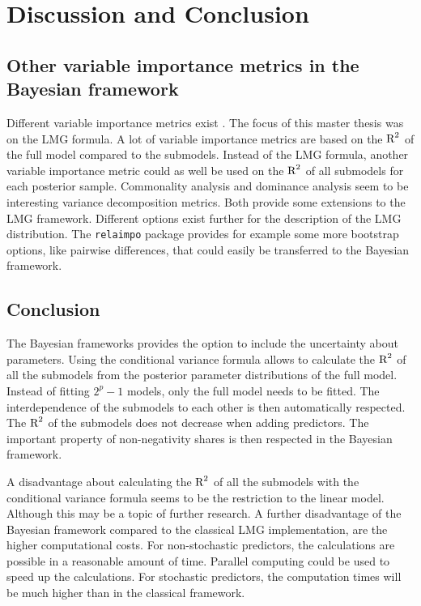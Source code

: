 \documentclass[11pt,a4paper,twoside]{book}\usepackage[]{graphicx}\usepackage[]{color}
\begin{document}






\chapter{Discussion and Conclusion}

\section{Other variable importance metrics in the Bayesian framework}

Different variable importance metrics exist \citep{Gromping2015}. The focus of this master thesis was on the LMG formula.  A lot of variable importance metrics are based on the $\text{R}^2$ of the full model compared to the submodels. Instead of the LMG formula, another variable importance metric could as well be used on the $\text{R}^2$ of all  submodels for each posterior sample. Commonality analysis \citep{Nimon2008} and dominance analysis \citep{Gromping2015} seem to be interesting variance decomposition metrics. Both provide some extensions to the LMG framework. Different options exist further for the description of the LMG distribution. The \texttt{relaimpo} package provides for example some more bootstrap options, like pairwise differences, that could easily be transferred to the Bayesian framework. 
 
\section{Conclusion}

The Bayesian frameworks provides the option to include the uncertainty about parameters.  Using  the conditional variance formula allows to calculate the $\text{R}^2$ of all the submodels from the posterior parameter distributions of the full model. Instead of fitting $2^{p}-1$ models, only the full model needs to be fitted. The interdependence of the submodels to each other is then automatically respected. The $\text{R}^2$ of the submodels does not decrease when adding predictors. The important property of non-negativity shares is then respected in the Bayesian framework.

A disadvantage about calculating the $\text{R}^2$ of all the submodels with the conditional variance formula seems to be the restriction to the linear model. Although this may be a topic of further research. A further disadvantage of the Bayesian framework compared to the classical LMG implementation, are the higher computational costs. For non-stochastic predictors, the calculations are possible in a reasonable amount of time. Parallel computing could be used to speed up the calculations. For stochastic predictors, the computation times will be much higher than in the classical framework.
\end{document}

